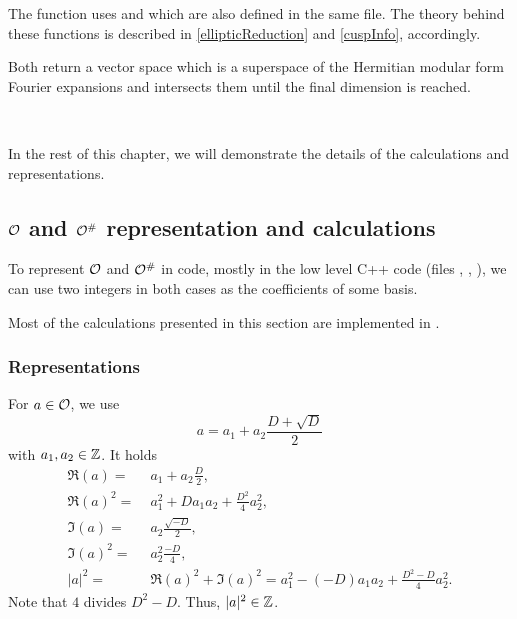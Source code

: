 The function  uses  and  which are also defined in the same file.
The theory behind these functions is described in \cref{ellipticReduction} and \cref{cuspInfo}, accordingly.

Both return a vector space which is a superspace of the Hermitian modular form Fourier expansions and  intersects them until the final dimension is reached.

\

In the rest of this chapter, we will demonstrate the details of the calculations and representations.


\subsection{$\mathcal{O}$ and $\mathcal{O}^\#$ representation and calculations}

To represent $\mathcal{O}$ and $\mathcal{O}^\#$ in code, mostly in the low level C++ code (files , , ), we can use two integers in both cases as the coefficients of some basis.

Most of the calculations presented in this section are implemented in .

\subsubsection{Representations}

\label{impl:repr:curlO}

For $a \in \mathcal{O}$, we use
\[ a = a_1 + a_2 \frac{D + \sqrt{D}} {2} \]
with $a_1,a_2 \in \mathbb{Z}$.
It holds
\begin{align*}
\Re(a) = &\; a_1 + a_2 \frac{D}{2} , \\
\Re(a)^2 =&\; a_1^2 + D a_1 a_2 + \frac{D^2}{4} a_2^2 , \\
\Im(a) =&\; a_2 \frac{\sqrt{-D}}{2} , \\
\Im(a)^2 =&\; a_2^2 \frac{-D}{4} , \\
|a|^2 =&\; \Re(a)^2 + \Im(a)^2 = a_1^2 - (-D) a_1 a_2 + \frac{D^2-D}{4} a_2^2 .
\end{align*}
Note that $4$ divides $D^2 - D$. Thus, $|a|^2 \in \mathbb{Z}$.

